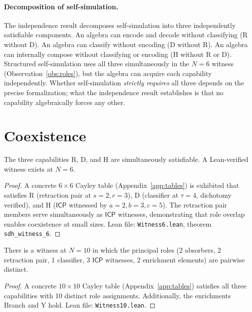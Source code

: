 \documentclass[a4paper,UKenglish,cleveref,autoref,thm-restate]{lipics-v2021}
\newcommand{\ICP}{\textsf{ICP}}
\begin{document}
\paragraph{Decomposition of self-simulation.}
The independence result decomposes self-simulation into three independently satisfiable components. An algebra can encode and decode without classifying (R without D). An algebra can classify without encoding (D without R). An algebra can internally compose without classifying or encoding (H without R or D). Structured self-simulation uses all three simultaneously in the $N\!=\!6$ witness (Observation~\ref{obs:roles}), but the algebra can acquire each capability independently. Whether self-simulation \emph{strictly requires} all three depends on the precise formalization; what the independence result establishes is that no capability algebraically forces any other.

\section{Coexistence}
\label{sec:bound}

\begin{theorem}
\label{thm:bound}
The three capabilities R, D, and H are simultaneously satisfiable. A Lean-verified witness exists at $N\!=\!6$.
\end{theorem}

\begin{proof}
A concrete $6 \times 6$ Cayley table (Appendix~\ref{app:tables}) is exhibited that satisfies R (retraction pair at $s\!=\!2, r\!=\!3$), D (classifier at $\tau\!=\!4$, dichotomy verified), and H ($\ICP$ witnessed by $a\!=\!2, b\!=\!3, c\!=\!5$). The retraction pair members serve simultaneously as $\ICP$ witnesses, demonstrating that role overlap enables coexistence at small sizes. Lean file: \texttt{Witness6.lean}, theorem \texttt{sdh\_witness\_6}.
\end{proof}

\begin{proposition}
\label{thm:separated}
There is a witness at $N\!=\!10$ in which the principal roles (2 absorbers, 2 retraction pair, 1 classifier, 3 $\ICP$ witnesses, 2 enrichment elements) are pairwise distinct.
\end{proposition}

\begin{proof}
A concrete $10 \times 10$ Cayley table (Appendix~\ref{app:tables}) satisfies all three capabilities with 10 distinct role assignments. Additionally, the enrichments Branch and Y hold. Lean file: \texttt{Witness10.lean}.
\end{proof}
\end{document}
